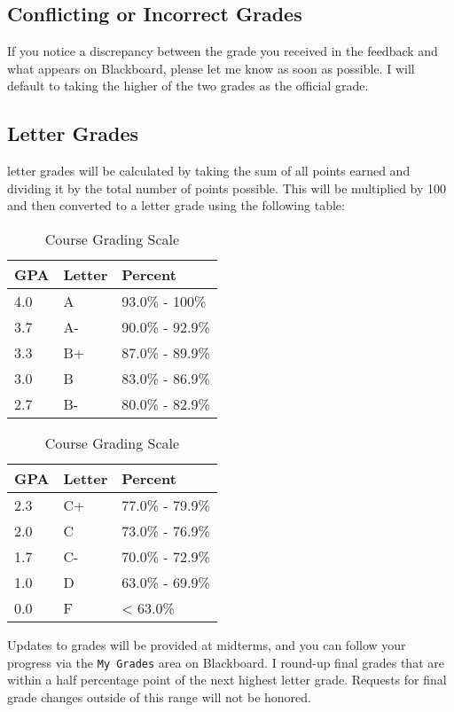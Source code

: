 \documentclass[
]{book}
\begin{document}
\hypertarget{conflicting-or-incorrect-grades}{%
\subsection{Conflicting or Incorrect Grades}\label{conflicting-or-incorrect-grades}}

If you notice a discrepancy between the grade you received in the feedback and what appears on Blackboard, please let me know as soon as possible. I will default to taking the higher of the two grades as the official grade.

\hypertarget{letter-grades}{%
\subsection{Letter Grades}\label{letter-grades}}

letter grades will be calculated by taking the sum of all points earned and dividing it by the total number of points possible. This will be multiplied by 100 and then converted to a letter grade using the following table:

\begin{table}
\caption{\label{tab:unnamed-chunk-12}Course Grading Scale}

\centering
\begin{tabular}[t]{lll}
\toprule
GPA & Letter & Percent\\
\midrule
4.0 & A & 93.0\% - 100\%\\
3.7 & A- & 90.0\% - 92.9\%\\
3.3 & B+ & 87.0\% - 89.9\%\\
3.0 & B & 83.0\% - 86.9\%\\
2.7 & B- & 80.0\% - 82.9\%\\
\bottomrule
\end{tabular}
\centering
\begin{tabular}[t]{lll}
\toprule
GPA & Letter & Percent\\
\midrule
2.3 & C+ & 77.0\% - 79.9\%\\
2.0 & C & 73.0\% - 76.9\%\\
1.7 & C- & 70.0\% - 72.9\%\\
1.0 & D & 63.0\% - 69.9\%\\
0.0 & F & < 63.0\%\\
\bottomrule
\end{tabular}
\end{table}

Updates to grades will be provided at midterms, and you can follow your progress via the \texttt{My\ Grades} area on Blackboard. I round-up final grades that are within a half percentage point of the next highest letter grade. Requests for final grade changes outside of this range will not be honored.
\end{document}

